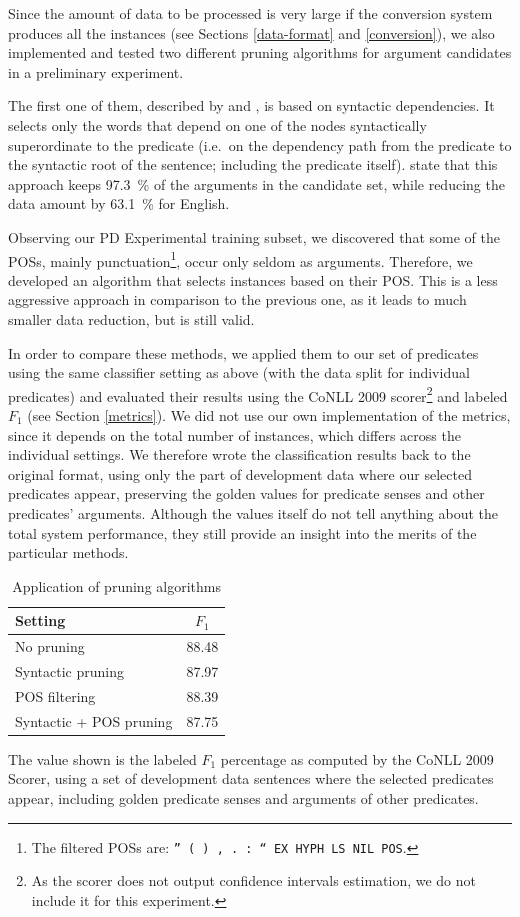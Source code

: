 \documentclass[12pt,notitlepage,a4paper]{report}
\begin{document}
Since the amount of data to be processed is very large if the conversion system produces all the instances (see Sections \ref{data-format} and \ref{conversion}), we also implemented and tested two different pruning algorithms for argument candidates in a preliminary experiment.

The first one of them, described by \citet{asahara09} and \citet{zhao09}, is based on syntactic dependencies. It selects only the words that depend on one of the nodes syntactically superordinate to the predicate (i.e.\ on the dependency path from the predicate to the syntactic root of the sentence; including the predicate itself). \citeauthor{asahara09} state that this approach keeps 97.3~\% of the arguments in the candidate set, while reducing the data amount by 63.1~\% for English.

Observing our PD Experimental training subset, we discovered that some of the POSs, mainly punctuation\footnote{The filtered POSs are: \texttt{'' ( ) , . : `` EX HYPH LS NIL POS}.}, occur only seldom as arguments. Therefore, we developed an algorithm that selects instances based on their POS. This is a less aggressive approach in comparison to the previous one, as it leads to much smaller data reduction, but is still valid.

In order to compare these methods, we applied them to our set of predicates using the same classifier setting as above (with the data split for individual predicates) and evaluated their results using the CoNLL 2009 scorer\footnote{As the scorer does not output confidence intervals estimation, we do not include it for this experiment.} and labeled $F_1$ (see Section \ref{metrics}). We did not use our own implementation of the metrics, since it depends on the total number of instances, which differs across the individual settings. We therefore wrote the classification results back to the original format, using only the part of development data where our selected predicates appear, preserving the golden values for predicate senses and other predicates' arguments. Although the values itself do not tell anything about the total system performance, they still provide an insight into the merits of the particular methods.

\begin{table}[htb]\label{tab:prune}
\caption{Application of pruning algorithms}\footnotesize
\begin{center}
\begin{tabular}{|l|c|}\hline
\bf Setting & $F_1$ \\\hline
No pruning & 88.48 \\
Syntactic pruning & 87.97 \\
POS filtering & 88.39 \\
Syntactic + POS pruning & 87.75 \\\hline
\end{tabular}
\end{center}
The value shown is the labeled $F_1$ percentage as computed by the CoNLL 2009 Scorer, using a set of development data sentences where the selected predicates appear, including golden predicate senses and arguments of other predicates.
\end{table}
\end{document}
